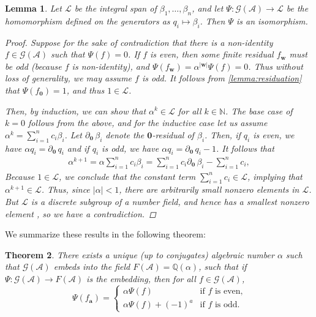 \documentclass[12pt, letterpaper]{article}
\newcommand{\N}{\mathbb N}
\newcommand{\Q}{\mathbb Q}
\newcommand{\A}{\mathcal A}
\newcommand{\ch}[1]{\mathbf{#1}}
\newcommand{\res}[2]{{{#1}_{\ch{#2}}}}
\newcommand{\gp}{\mathcal G}
\newtheorem{thm}{Theorem}[section]
\newtheorem{lemma}[thm]{Lemma}
\begin{document}
\begin{lemma}\label{lemma:solution_faithful}
    Let $\mathcal L$ be the integral span of $\beta_1, \ldots, \beta_n$, and
    let $\Psi: \gp(\A) \rightarrow \mathcal L$ be the homomorphism defined on
    the generators as $q_i \mapsto \beta_i$. Then $\Psi$ is an isomorphism.
    \begin{proof}
        Suppose for the sake of contradiction that there is a non-identity $f
        \in \gp(\A)$ such that $\Psi(f) = 0$. If $f$ is even, then some finite
        residual $\res{f}{w}$ must be odd (because $f$ is non-identity), and
        $\Psi(\res{f}{w}) = \alpha^{|\ch{w}|} \Psi(f) = 0$.  Thus without loss
        of generality, we may assume $f$ is odd. It follows from
        \cref{lemma:residuation} that $\Psi(\res{f}{0}) = 1$, and thus $1 \in
        \mathcal L$.

        \newcommand{\resz}[1]{\partial_{\ch{0}}\,#1}

        Then, by induction, we can show that $\alpha^k \in \mathcal L$ for all
        $k \in \N$. The base case of $k = 0$ follows from the above, and for
        the inductive case let us assume $\alpha^k = \sum_{i = 1}^n c_i
        \beta_i$. Let $\resz{\beta_i}$ denote the $\ch{0}$-residual
        of $\beta_i$.  Then, if $q_i$ is even, we have $\alpha q_i =
        \resz{q_i}$ and if $q_i$ is odd, we have $\alpha q_i =
        \resz{q_i} - 1$. It follows that
        \begin{align*}
            \alpha^{k+1} = \alpha \sum_{i = 1}^n c_i \beta_i =
            \sum_{i = 1}^n c_i \resz{\beta_i} - \sum_{i = 1}^n c_i,
        \end{align*}
        Because $1 \in \mathcal L$, we conclude that the constant
        term $\sum_{i = 1}^n c_i \in \mathcal L$, implying that $\alpha^{k+1}
        \in \mathcal L$. Thus, since $|\alpha| < 1$, there are arbitrarily
        small nonzero elements in $\mathcal L$. But $\mathcal L$ is a discrete
        subgroup of a number field, and hence has a smallest nonzero element
        \cite{stein2012algebraic}, so we have a contradiction.
    \end{proof}
\end{lemma}

We summarize these results in the following theorem:
\begin{thm}\label{thm:field_representation_unique}
    There exists a unique (up to conjugates) algebraic number $\alpha$ such that
    $\gp(\A)$ embeds into the field $F(\A) = \Q(\alpha)$, such that if
    $\Psi: \gp(\A) \rightarrow F(\A)$ is the embedding, then for all $f \in
    \gp(\A)$,
    \[
        \Psi(\res{f}{a}) = \begin{cases}
            \alpha \Psi(f) & \text{if $f$ is even,}\\
            \alpha \Psi(f) + (-1)^a & \text{if $f$ is odd.}
        \end{cases}
    \]
\end{thm}
\end{document}
